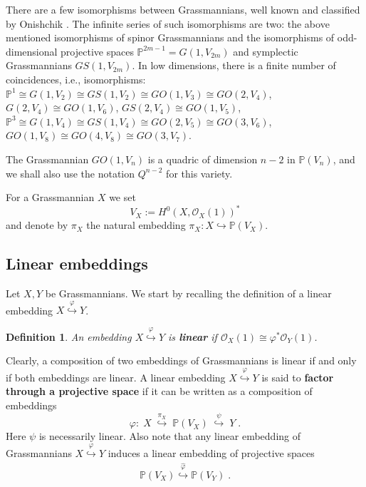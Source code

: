 \documentclass[12pt]{amsart}
\def\PP {{\mathbb P}}     %
\def\mc {\mathcal}
\newtheorem{definition}{Definition}[section]
\begin{document}
There are a few isomorphisms between Grassmannians, well known and classified by Onishchik \cite[Theorem 7.1]{Onishchik}. The infinite series of such isomorphisms are two: the above mentioned isomorphisms of spinor Grassmannians and the isomorphisms of odd-dimensional projective spaces $\PP^{2m-1}=G(1,V_{2m})$ and symplectic Grassmannians $GS(1,V_{2m})$. In low dimensions, there is a finite number of coincidences, i.e., isomorphisms: $\PP^1\cong G(1,V_2)\cong GS(1,V_2)\cong GO(1,V_3)\cong GO(2,V_4)$, $G(2,V_4)\cong GO(1,V_6)$, $GS(2,V_4)\cong GO(1,V_5)$, $\PP^3\cong G(1,V_4) \cong GS(1,V_4) \cong GO(2,V_5) \cong GO(3,V_6)$, $GO(1,V_8)\cong GO(4,V_8)\cong GO(3,V_7)$.

The Grassmannian $GO(1,V_{n})$ is a quadric of dimension $n-2$ in $\PP(V_n)$, and we shall also use the notation $Q^{n-2}$ for this variety.

For a Grassmannian $X$ we set
$$
V_X:=H^0(X,\mc O_X(1))^*
$$
and denote by $\pi_X$ the natural embedding $\pi_X:X\hookrightarrow\PP(V_X)$.


\subsection{Linear embeddings}

Let $X,Y$ be Grassmannians. We start by recalling the definition of a linear embedding $X \stackrel{\varphi}{\hookrightarrow} Y$.

\begin{definition}
An embedding $X \stackrel{\varphi}{\hookrightarrow} Y$ is {\bf linear} if ${\mc O}_X(1)\cong\varphi^*\mc O_Y(1)$.
\end{definition}

Clearly, a composition of two embeddings of Grassmannians is linear if and only if both embeddings are linear. A linear embedding $X\stackrel{\varphi}{\hookrightarrow} Y$ is said to {\bf factor through a projective space} if it can be written as a composition of embeddings
$$
\varphi: \; X \; \stackrel{\pi_X}{\hookrightarrow} \; \PP(V_X) \; \stackrel{\psi}{\hookrightarrow} \; Y \;.
$$
Here $\psi$ is necessarily linear. Also note that any linear embedding of Grassmannians $X \stackrel{\varphi}{\hookrightarrow} Y$ induces a linear embedding of projective spaces
\begin{gather}\label{For hat phi}
\PP(V_X) \stackrel{\hat\varphi}{\hookrightarrow} \PP(V_Y)\;.
\end{gather}
\end{document}
